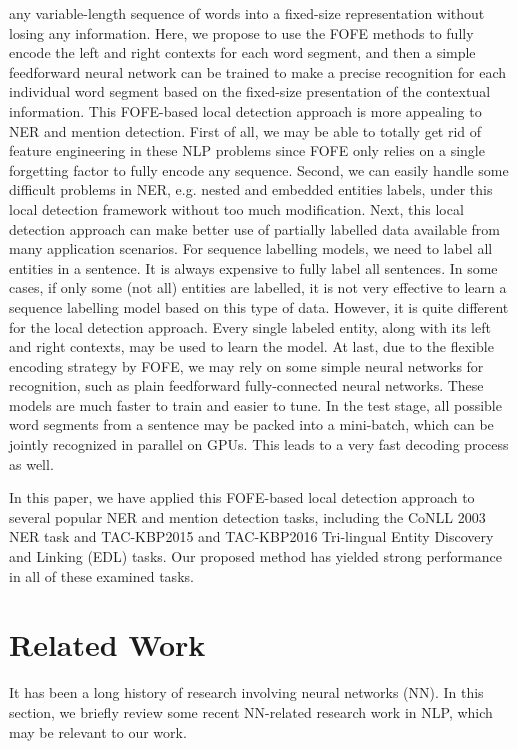 \documentclass[11pt,a4paper]{article}
\begin{document}
any variable-length sequence of words into a fixed-size representation without losing any information. Here, we propose to use the FOFE methods to fully encode the left and right contexts for each word segment, and then a simple feedforward neural network can be trained to make a precise recognition for each individual word segment based on the fixed-size presentation of the contextual information. This FOFE-based local detection approach is more appealing to NER and mention detection. First of all,  we may be able to totally get rid of feature engineering in these NLP problems since FOFE only relies on a single forgetting factor to fully encode any sequence. Second,  we can easily handle some difficult problems in NER, e.g. nested and embedded entities labels, under this local detection framework  without too much modification. Next,  this local detection approach can make better use of partially labelled data available from many application scenarios. For sequence labelling models, we need to label all entities in a sentence. It is always expensive to fully label all sentences. In some cases, if only some (not all) entities are labelled, it is not very effective to learn a sequence labelling model based on this type of data. However, it is quite different for the local detection approach. Every single labeled entity, along with its left and right contexts, may be used to learn the model. At last, due to the flexible encoding strategy by FOFE, we may rely on some simple neural networks for recognition, such as plain feedforward fully-connected neural networks. These models are much faster to train and easier to tune. In the test stage, all possible word segments from a sentence may be packed into a mini-batch, which can be jointly recognized in parallel on GPUs. This leads to a very fast decoding process as well.

In this paper, we have applied this FOFE-based local detection approach to several popular NER and mention detection tasks, including the CoNLL 2003 NER task and 
TAC-KBP2015 and TAC-KBP2016 Tri-lingual Entity Discovery and Linking (EDL) tasks.
Our proposed method has yielded strong performance in all of these examined tasks. 

\section{Related Work}
\label{sec_related_work}

It has been a long history of research involving neural networks (NN). In this section, we briefly review some recent NN-related research work in NLP, which may be relevant to our work. 
\end{document}

